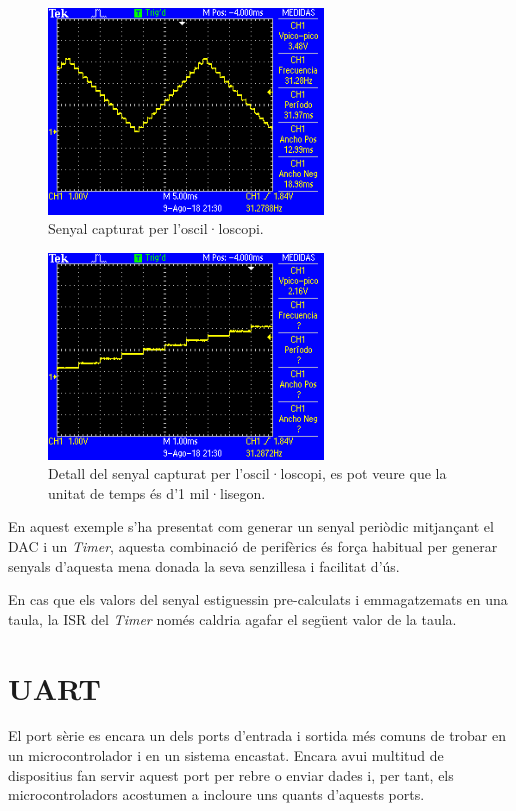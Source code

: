\begin{figure}
 \centering
 \includegraphics[width=0.65\textwidth, keepaspectratio]{imatges/DAC_result_osc}
 \caption{Senyal capturat per l'oscil·loscopi.}
 \label{fig:DAC_result}
\end{figure}

\begin{figure}
 \centering
 \includegraphics[width=0.65\textwidth, keepaspectratio]{imatges/DAC_result_osc_zoom}
 \caption{Detall del senyal capturat per l'oscil·loscopi, es pot veure que la unitat de temps és d'1 mil·lisegon.}
 \label{fig:DAC_result_zoom}
\end{figure}

En aquest exemple s'ha presentat com generar un senyal periòdic mitjançant el \gls{DAC} i un {\em Timer}, aquesta combinació de perifèrics és força habitual per generar senyals d'aquesta mena donada la seva senzillesa i facilitat d'ús.

En cas que els valors del senyal estiguessin pre-calculats i emmagatzemats en una taula, la \gls{ISR} del {\em Timer} només caldria agafar el següent valor de la taula.

\chapter{UART}
\label{sub:UART}
El port sèrie es encara un dels ports d'entrada i sortida més comuns de trobar en un microcontrolador i en un sistema encastat. Encara avui multitud de dispositius fan servir aquest port per rebre o enviar dades i, per tant, els microcontroladors acostumen a incloure uns quants d'aquests ports.

